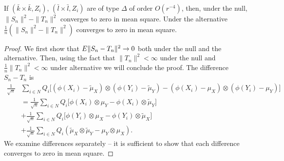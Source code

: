 \begin{lemma}
\label{lem:difS_nT_n}
 If $(\bar k \times \bar k,Z_i)$, $(\bar l \times \bar l,Z_i)$  are of type $\varDelta$ of order $O(r^{-4})$, then, under the null,  $\|S_n\|^2- \|T_n\|^2$  converges to zero in mean square. Under the alternative $\frac 1 n (\|S_n\|^2- \|T_n\|^2) $ converges to zero in  mean square.
\end{lemma}
\begin{proof}
We first show that $E \| S_n- T_n\|^2 \to 0$ both under the null and the alternative. Then,  using the fact that $\|T_n\|^2< \infty$ under the null  and $\frac 1 n \|T_n\|^2< \infty $ under alternative we  will conclude the proof. The difference $S_n- T_n$ is 
\begin{align*}
\label{eq:diferencesAgain}
 \frac {1} { \sqrt n} &\sum_{i \in N}Q_i \bigg[ (\phi(X_i) - \tilde \mu_X ) \otimes (\phi(Y_i )  - \tilde \mu_Y) - ( \phi(X_i) -  \mu_X ) \otimes(\phi(Y_i )  -  \mu_Y)\bigg] \\
&= \frac {1} { \sqrt n} \sum_{i \in N} Q_i \bigg[    \phi(X_i)  \otimes   \mu_Y -\phi(X_i) \otimes \tilde \mu_Y \bigg]  \\
&+\frac {1} { \sqrt n} \sum_{i \in N} Q_i \bigg[    \phi(Y_i)  \otimes   \mu_X -\phi(Y_i) \otimes \tilde \mu_X \bigg] \\
&+\frac {1} { \sqrt n} \sum_{i \in N}Q_i  ( \tilde  \mu_X   \otimes \tilde \mu_Y - \mu_Y \otimes \mu_X).
\end{align*}
We  examine differences separately -- it is sufficient to show that each difference converges to zero in mean square. 


\end{proof}
